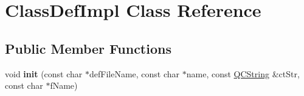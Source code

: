 \hypertarget{class_class_def_impl}{}\section{Class\+Def\+Impl Class Reference}
\label{class_class_def_impl}
\subsection*{Public Member Functions}
\begin{DoxyCompactItemize}
\item 
\mbox{\label{class_class_def_impl_a4876a8d9d670f4f6f524e92909a557c4}} 
void {\bfseries init} (const char $\ast$def\+File\+Name, const char $\ast$name, const \mbox{\hyperlink{class_q_c_string}{Q\+C\+String}} \&ct\+Str, const char $\ast$f\+Name)
\end{DoxyCompactItemize}
